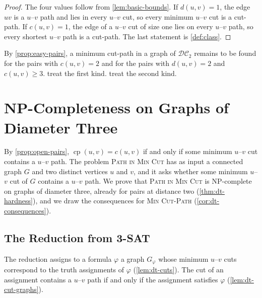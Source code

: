 \documentclass[pdflatex,sn-mathphys-num]{sn-jnl}%
\theoremstyle{thmstyleone}%
\theoremstyle{thmstyletwo}%
\theoremstyle{thmstylethree}%
\newcommand{\cp}{\operatorname{cp}}%
\newcommand{\DC}{\mathcal{DC}_2}%
\newcommand{\MinCutPath}{\textsc{Min Cut-Path}}%
\newcommand{\PathInMinCut}{\textsc{Path in Min Cut}}%
\begin{document}
\begin{proof}
The four values follow from \cref{lem:basic-bounds}.
If $d(u, v) = 1$, the edge $uv$ is a $u$--$v$ path and lies in every $u$--$v$ cut, so every minimum $u$--$v$ cut is a cut-path.
If $c(u, v) = 1$, the edge of a $u$--$v$ cut of size one lies on every $u$--$v$ path, so every shortest $u$--$v$ path is a cut-path.
The last statement is \cref{def:class}.
\end{proof}

By \cref{prop:easy-pairs}, a minimum cut-path in a graph of $\DC$ remains to be found for the pairs with $c(u, v) = 2$ and for the pairs with $d(u, v) = 2$ and $c(u, v) \geq 3$.
 treat the first kind.
 treat the second kind.

\section{NP-Completeness on Graphs of Diameter Three}
\label{sec:dt-diameter-three}

By \cref{prop:open-pairs}, $\cp(u, v) = c(u, v)$ if and only if some minimum $u$--$v$ cut contains a $u$--$v$ path.
The problem \PathInMinCut{} has as input a connected graph $G$ and two distinct vertices $u$ and $v$, and it asks whether some minimum $u$--$v$ cut of $G$ contains a $u$--$v$ path.
We prove that \PathInMinCut{} is NP-complete on graphs of diameter three, already for pairs at distance two (\cref{thm:dt-hardness}), and we draw the consequences for \MinCutPath{} (\cref{cor:dt-consequences}).

\subsection{The Reduction from 3-SAT}
\label{sec:dt-construction}

The reduction assigns to a formula $\varphi$ a graph $G_\varphi$ whose minimum $u$--$v$ cuts correspond to the truth assignments of $\varphi$ (\cref{lem:dt-cuts}).
The cut of an assignment contains a $u$--$v$ path if and only if the assignment satisfies $\varphi$ (\cref{lem:dt-cut-graphs}).
\end{document}
